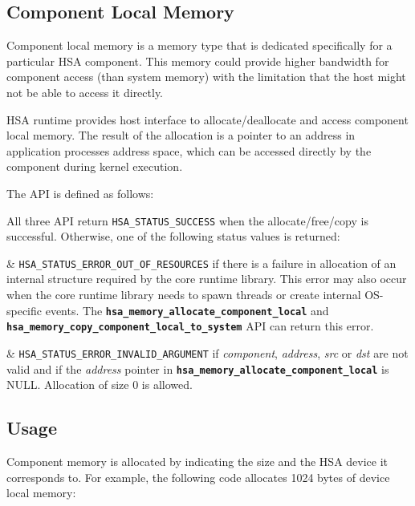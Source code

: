 \documentclass{book}
\newcommand{\diffblock}[1]{#1}
\newcommand{\ttbf}[1]{\diffblock{\texttt{\textbf{#1}}}}
\begin{document}
\hypertarget{coreapi_device_memory}{}\subsection{Component Local Memory}\label{coreapi_device_memory}

Component local memory is a memory type that is dedicated
specifically for a particular HSA component. This memory could
provide higher bandwidth for component access (than system memory)
with the limitation that the host might not be able to access it
directly.

H\-S\-A runtime provides host interface to allocate/deallocate and
access component local memory. The result of the allocation is a
pointer to an address in application processes address space, which
can be accessed directly by the component during kernel execution.

The API is defined as follows:



All three API return \texttt{HSA\_STATUS\_SUCCESS} when the
allocate/free/copy is successful. Otherwise, one of the following
status values is returned:

\begin{easylist}

& \texttt{HSA\_STATUS\_ERROR\_OUT\_OF\_RESOURCES} if there is a
failure in allocation of an internal structure required by the core
runtime library. This error may also occur when the core runtime
library needs to spawn threads or create internal OS-specific
events. The \ttbf{hsa\_memory\_allocate\_component\_local} and
\ttbf{hsa\_memory\_copy\_component\_local\_to\_system} API can
return this error.

& \texttt{HSA\_STATUS\_ERROR\_INVALID\_ARGUMENT} if {\itshape
component}, {\itshape address}, {\itshape src} or {\itshape dst} are
not valid and if the {\itshape address} pointer in
\ttbf{hsa\_memory\_allocate\_component\_local} is NULL. Allocation
of size 0 is allowed.

\end{easylist}

\hypertarget{coreapi_device_memory_usage}{}\subsection{Usage}\label{coreapi_device_memory_usage}

Component memory is allocated by indicating the size and the H\-S\-A
device it corresponds to. For example, the following code allocates
1024 bytes of device local memory\-:
\end{document}

